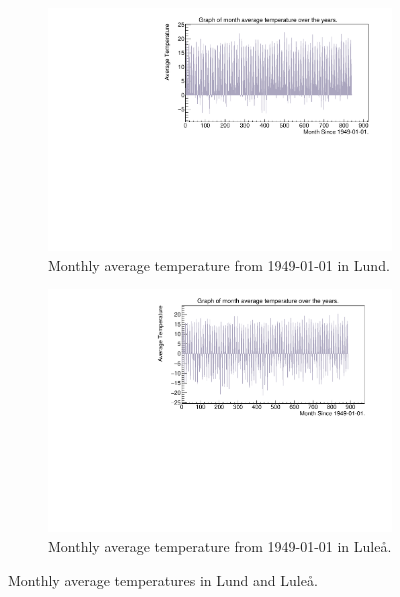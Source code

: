 \documentclass[aps,prl,groupedaddress,twocolumn]{revtex4-1}
\begin{document}
\begin{figure}[h!]
    \begin{subfigure}{0.45\textwidth}
            \includegraphics[width=\textwidth]{monthlyAverageTemperatureLund.pdf}
            \caption{Monthly average temperature from 1949-01-01 in Lund.}
            \label{fig:monthlyLund}
    \end{subfigure}
    \hfill
    \begin{subfigure}{0.45\textwidth}
            \includegraphics[width=\textwidth]{monthlyAverageTemperatureLulea.pdf}
            \caption{Monthly average temperature from 1949-01-01 in Luleå.}
            \label{fig:monthlyLulea}
    \end{subfigure}
    \caption{Monthly average temperatures in Lund and Luleå.}
    \label{fig:monthlyTemp}
\end{figure}
\vspace{-0.3cm}
\end{document}
